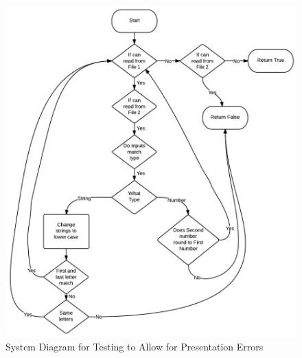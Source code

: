 \begin{figure}[tbh]
\begin{center}
\includegraphics[width=1\textwidth]{./SystemDiagram2}
\end{center}
\caption{System Diagram for Testing to Allow for Presentation Errors\label{systemdiagram2}}
\end{figure}

